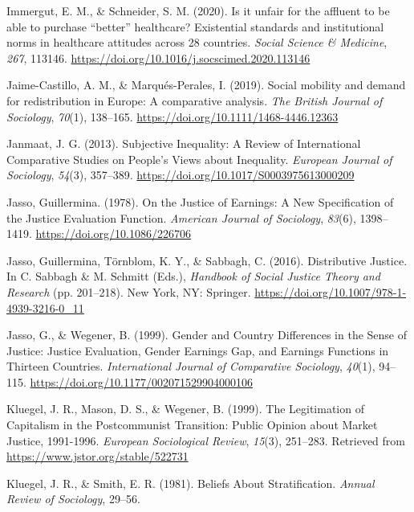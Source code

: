 \documentclass[
  13pt,
]{article}
\newlength{\cslhangindent}
\newenvironment{CSLReferences}[2] %
 {\begin{list}{}{%
  \setlength{\itemindent}{0pt}
  \setlength{\leftmargin}{0pt}
  \setlength{\parsep}{0pt}
  \ifodd #1
   \setlength{\leftmargin}{\cslhangindent}
   \setlength{\itemindent}{-1\cslhangindent}
  \fi
  \setlength{\itemsep}{#2\baselineskip}}}
 {\end{list}}
\begin{document}
\begin{CSLReferences}{1}{0}
Immergut, E. M., \& Schneider, S. M. (2020). Is it unfair for the
affluent to be able to purchase {``better''} healthcare? {Existential}
standards and institutional norms in healthcare attitudes across 28
countries. \emph{Social Science \& Medicine}, \emph{267}, 113146.
\url{https://doi.org/10.1016/j.socscimed.2020.113146}

Jaime-Castillo, A. M., \& Marqués-Perales, I. (2019). Social mobility
and demand for redistribution in {Europe}: A comparative analysis.
\emph{The British Journal of Sociology}, \emph{70}(1), 138--165.
\url{https://doi.org/10.1111/1468-4446.12363}

Janmaat, J. G. (2013). Subjective {Inequality}: A {Review} of
{International Comparative Studies} on {People}'s {Views} about
{Inequality}. \emph{European Journal of Sociology}, \emph{54}(3),
357--389. \url{https://doi.org/10.1017/S0003975613000209}

Jasso, Guillermina. (1978). On the {Justice} of {Earnings}: {A New
Specification} of the {Justice Evaluation Function}. \emph{American
Journal of Sociology}, \emph{83}(6), 1398--1419.
\url{https://doi.org/10.1086/226706}

Jasso, Guillermina, Törnblom, K. Y., \& Sabbagh, C. (2016). Distributive
{Justice}. In C. Sabbagh \& M. Schmitt (Eds.), \emph{Handbook of {Social
Justice Theory} and {Research}} (pp. 201--218). New York, NY: Springer.
\url{https://doi.org/10.1007/978-1-4939-3216-0_11}

Jasso, G., \& Wegener, B. (1999). Gender and {Country Differences} in
the {Sense} of {Justice}: {Justice Evaluation}, {Gender Earnings Gap},
and {Earnings Functions} in {Thirteen Countries}. \emph{International
Journal of Comparative Sociology}, \emph{40}(1), 94--115.
\url{https://doi.org/10.1177/002071529904000106}

Kluegel, J. R., Mason, D. S., \& Wegener, B. (1999). The {Legitimation}
of {Capitalism} in the {Postcommunist Transition}: {Public Opinion}
about {Market Justice}, 1991-1996. \emph{European Sociological Review},
\emph{15}(3), 251--283. Retrieved from
\url{https://www.jstor.org/stable/522731}

Kluegel, J. R., \& Smith, E. R. (1981). Beliefs {About Stratification}.
\emph{Annual Review of Sociology}, 29--56.


\end{CSLReferences}
\end{document}
